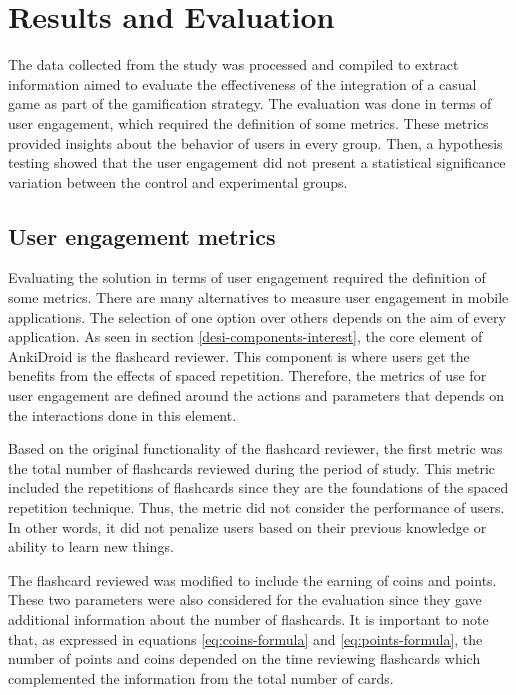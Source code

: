 
\chapter{Results and Evaluation} %

\label{resu} %

The data collected from the study was processed and compiled to extract information aimed to evaluate the effectiveness of the integration of a casual game as part of the gamification strategy. The evaluation was done in terms of user engagement, which required the definition of some metrics. These metrics provided insights about the behavior of users in every group. Then, a hypothesis testing showed that the user engagement did not present a statistical significance variation between the control and experimental groups.

\section{User engagement metrics}
Evaluating the solution in terms of user engagement required the definition of some metrics. There are many alternatives to measure user engagement in mobile applications. The selection of one option over others depends on the aim of every application. As seen in section \ref{desi-components-interest}, the core element of AnkiDroid is the flashcard reviewer. This component is where users get the benefits from the effects of spaced repetition. Therefore, the metrics of use for user engagement are defined around the actions and parameters that depends on the interactions done in this element.

Based on the original functionality of the flashcard reviewer, the first metric was the total number of flashcards reviewed during the period of study. This metric included the repetitions of flashcards since they are the foundations of the spaced repetition technique. Thus, the metric did not consider the performance of users. In other words, it did not penalize users based on their previous knowledge or ability to learn new things.

The flashcard reviewed was modified to include the earning of coins and points. These two parameters were also considered for the evaluation since they gave additional information about the number of flashcards. It is important to note that, as expressed in equations \ref{eq:coins-formula} and \ref{eq:points-formula}, the number of points and coins depended on the time reviewing flashcards which complemented the information from the total number of cards.

